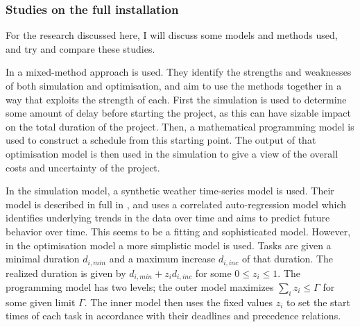 \documentclass[a4paper,12pt]{article}
\begin{document}
\subsubsection{Studies on the full installation} \label{sss:sched}
For the research discussed here, I will discuss some models and methods used, and try and compare these studies. 

\bigskip

In \cite{barlow2018mixed} a mixed-method approach is used. They identify the strengths and weaknesses of both simulation and optimisation, and aim to use the methods together in a way that exploits the strength of each. First the simulation is used to determine some amount of delay before starting the project, as this can have sizable impact on the total duration of the project. Then, a mathematical programming model is used to construct a schedule from this starting point. The output of that optimisation model is then used in the simulation to give a view of the overall costs and uncertainty of the project. 

In the simulation model, a synthetic weather time-series model is used. Their model is described in full in \cite{dinwoodie2014operational} , and uses a correlated auto-regression model which identifies underlying trends in the data over time and aims to predict future behavior over time. This seems to be a fitting and sophisticated model. However, in the optimisation model a more simplistic model is used. Tasks are given a minimal duration $d_{i, min}$ and a maximum increase $d_{i, inc}$ of that duration. The realized duration is given by $d_{i,  min} + z_i d_{i, inc}$ for some $0 \leq z_i \leq 1$. The programming model has two levels; the outer model maximizes $\sum_i z_i \leq \Gamma$ for some given limit $\Gamma$. The inner model then uses the fixed values $z_i$ to set the start times of each task in accordance with their deadlines and precedence relations. 
\end{document}
